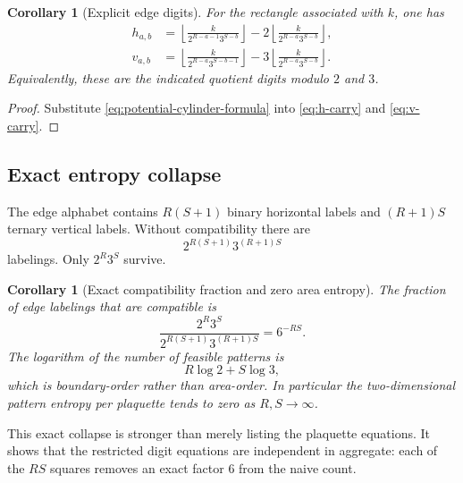 \documentclass[11pt]{article}
\newtheorem{corollary}[theorem]{Corollary}
\theoremstyle{definition}
\theoremstyle{remark}
\newcommand{\floor}[1]{\left\lfloor#1\right\rfloor}
\begin{document}
\begin{corollary}[Explicit edge digits]\label{cor:explicit-edge-digits}
For the rectangle associated with $k$, one has
\begin{align}
 h_{a,b}
 &=\floor{\frac{k}{2^{R-a-1}3^{S-b}}}
 -2\floor{\frac{k}{2^{R-a}3^{S-b}}},\label{eq:explicit-h}\\
 v_{a,b}
 &=\floor{\frac{k}{2^{R-a}3^{S-b-1}}}
 -3\floor{\frac{k}{2^{R-a}3^{S-b}}}.
 \label{eq:explicit-v}
\end{align}
Equivalently, these are the indicated quotient digits modulo $2$ and $3$.
\end{corollary}

\begin{proof}
Substitute \eqref{eq:potential-cylinder-formula} into
\eqref{eq:h-carry} and \eqref{eq:v-carry}.
\end{proof}

\subsection{Exact entropy collapse}

The edge alphabet contains $R(S+1)$ binary horizontal labels and $(R+1)S$ ternary
vertical labels.  Without compatibility there are
\begin{equation}\label{eq:naive-label-count}
 2^{R(S+1)}3^{(R+1)S}
\end{equation}
labelings.  Only $2^R3^S$ survive.

\begin{corollary}[Exact compatibility fraction and zero area entropy]
\label{cor:entropy-collapse}
The fraction of edge labelings that are compatible is
\begin{equation}\label{eq:compatibility-fraction}
 \frac{2^R3^S}{2^{R(S+1)}3^{(R+1)S}}=6^{-RS}.
\end{equation}
The logarithm of the number of feasible patterns is
\begin{equation}\label{eq:boundary-entropy}
 R\log2+S\log3,
\end{equation}
which is boundary-order rather than area-order.  In particular the two-dimensional
pattern entropy per plaquette tends to zero as $R,S\to\infty$.
\end{corollary}

This exact collapse is stronger than merely listing the plaquette equations.  It
shows that the restricted digit equations are independent in aggregate: each of the
$RS$ squares removes an exact factor $6$ from the naive count.
\end{document}

